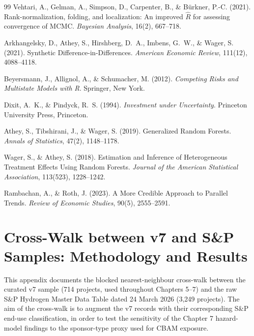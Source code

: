 \documentclass[11pt,a4paper]{article}
\begin{document}
\begin{thebibliography}{99}
Vehtari, A., Gelman, A., Simpson, D., Carpenter, B., \& Bürkner, P.-C. (2021).
\newblock Rank-normalization, folding, and localization: An improved $\hat{R}$ for assessing convergence of MCMC.
\newblock \textit{Bayesian Analysis}, 16(2), 667--718.


Arkhangelsky, D., Athey, S., Hirshberg, D.~A., Imbens, G.~W., \& Wager, S. (2021).
\newblock Synthetic Difference-in-Differences.
\newblock \emph{American Economic Review}, 111(12), 4088--4118.

Beyersmann, J., Allignol, A., \& Schumacher, M. (2012).
\newblock \emph{Competing Risks and Multistate Models with R}.
\newblock Springer, New York.

Dixit, A.~K., \& Pindyck, R.~S. (1994).
\newblock \emph{Investment under Uncertainty}.
\newblock Princeton University Press, Princeton.



Athey, S., Tibshirani, J., \& Wager, S. (2019).
\newblock Generalized Random Forests.
\newblock \emph{Annals of Statistics}, 47(2), 1148--1178.

Wager, S., \& Athey, S. (2018).
\newblock Estimation and Inference of Heterogeneous Treatment Effects Using Random Forests.
\newblock \emph{Journal of the American Statistical Association}, 113(523), 1228--1242.

Rambachan, A., \& Roth, J. (2023).
\newblock A More Credible Approach to Parallel Trends.
\newblock \emph{Review of Economic Studies}, 90(5), 2555--2591.


\end{thebibliography}


\appendix

\section{Cross-Walk between v7 and S\&P Samples: Methodology and Results}
\label{app:matching}

This appendix documents the blocked nearest-neighbour cross-walk between the curated v7 sample (714 projects, used throughout Chapters 5--7) and the raw S\&P Hydrogen Master Data Table dated 24 March 2026 (3{,}249 projects). The aim of the cross-walk is to augment the v7 records with their corresponding S\&P end-use classification, in order to test the sensitivity of the Chapter 7 hazard-model findings to the sponsor-type proxy used for CBAM exposure.
\end{document}
